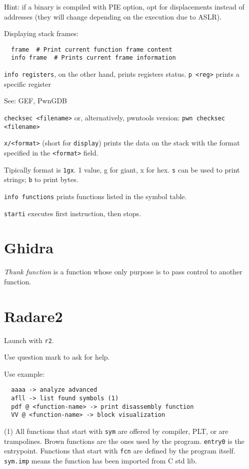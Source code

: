 Hint: if a binary is compiled with PIE option, opt for displacements instead of addresses (they will change depending on the execution due to ASLR).

Displaying stack frames:
\begin{verbatim}
  frame  # Print current function frame content
  info frame  # Prints current frame information
\end{verbatim}

\texttt{info registers}, on the other hand, prints registers status. \texttt{p <reg>} prints a specific register

See: GEF, PwnGDB

\texttt{checksec <filename>} or, alternatively, pwntools version: \texttt{pwn checksec <filename>}

\texttt{x/<format>} (short for \texttt{display}) prints the data on the stack with the format specified in the \texttt{<format>} field.

Tipically format is \texttt{1gx}. 1 value, g for giant, x for hex. \texttt{s} can be used to print strings; \texttt{b} to print bytes.

\texttt{info functions} prints functions listed in the symbol table.

\texttt{starti} executes first instruction, then stops.

\section{Ghidra}
\textit{Thunk function} is a function whose only purpose is to pass control to another function.

\section{Radare2}
Launch with \texttt{r2}.

Use question mark to ask for help.

Use example:
\begin{verbatim}
  aaaa -> analyze advanced
  afll -> list found symbols (1)
  pdf @ <function-name> -> print disassembly function
  VV @ <function-name> -> block visualization
\end{verbatim}

(1) All functions that start with \texttt{sym} are offered by compiler, PLT, or are trampolines.
Brown functions are the ones used by the program. \texttt{entry0} is the entrypoint.
Functions that start with \texttt{fcn} are defined by the program itself.
\texttt{sym.imp} means the function has been imported from C std lib.